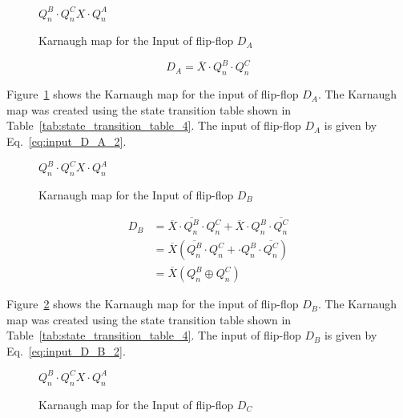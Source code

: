 \begin{figure}[ht!]
	\centering
	\begin{Karnaugh}{$Q^B_n \cdot Q^C_n$}{$X \cdot Q^A_n$}
	\end{Karnaugh}
	\caption{Karnaugh map for the Input of flip-flop $D_A$}\label{fig:input_D_A_2}
\end{figure}\FloatBarrier

\begin{equation}\label{eq:input_D_A_2}
	D_A = \overline{X} \cdot Q^B_n \cdot Q^C_n
\end{equation}

Figure~\ref{fig:input_D_A_2} shows the Karnaugh map for the input of flip-flop $D_A$. The Karnaugh map was created using the state transition table shown in Table~\ref{tab:state_transition_table_4}. The input of flip-flop $D_A$ is given by Eq.~\ref{eq:input_D_A_2}.

\begin{figure}[ht!]
	\centering
	\begin{Karnaugh}{$Q^B_n \cdot Q^C_n$}{$X \cdot Q^A_n$}
	\end{Karnaugh}
	\caption{Karnaugh map for the Input of flip-flop $D_B$}\label{fig:input_D_B_2}
\end{figure}\FloatBarrier

\begin{equation}
	\begin{split}
		D_B &= \overline{X} \cdot \overline{Q^B_n} \cdot Q^C_n + \overline{X} \cdot Q^B_n \cdot \overline{Q^C_n}\\
		&= \overline{X} \left( \overline{Q^B_n} \cdot Q^C_n + \cdot Q^B_n \cdot \overline{Q^C_n} \right)\\
		&= \overline{X} \left( Q^B_n \oplus Q^C_n \right)
	\end{split}
	\label{eq:input_D_B_2}
\end{equation}

Figure~\ref{fig:input_D_B_2} shows the Karnaugh map for the input of flip-flop $D_B$. The Karnaugh map was created using the state transition table shown in Table~\ref{tab:state_transition_table_4}. The input of flip-flop $D_B$ is given by Eq.~\ref{eq:input_D_B_2}.

\begin{figure}[ht!]
	\centering
	\begin{Karnaugh}{$Q^B_n \cdot Q^C_n$}{$X \cdot Q^A_n$}
	\end{Karnaugh}
	\caption{Karnaugh map for the Input of flip-flop $D_C$}\label{fig:input_D_C_2}
\end{figure}\FloatBarrier

